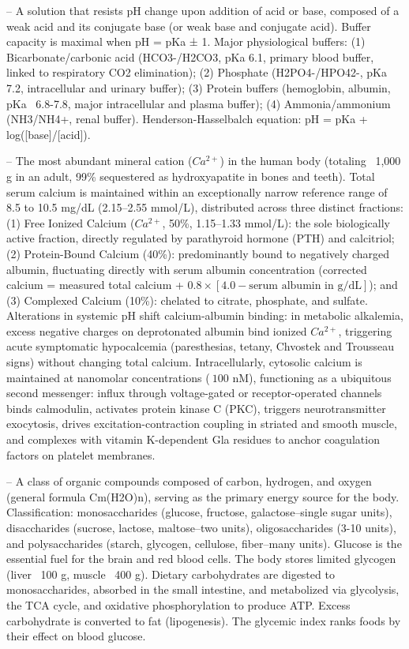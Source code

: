 -- A solution that resists pH change upon addition of acid or base, composed of a weak acid and its conjugate base (or weak base and conjugate acid). Buffer capacity is maximal when pH = pKa ± 1. Major physiological buffers: (1) Bicarbonate/carbonic acid (HCO3-/H2CO3, pKa 6.1, primary blood buffer, linked to respiratory CO2 elimination); (2) Phosphate (H2PO4-/HPO42-, pKa 7.2, intracellular and urinary buffer); (3) Protein buffers (hemoglobin, albumin, pKa ~6.8-7.8, major intracellular and plasma buffer); (4) Ammonia/ammonium (NH3/NH4+, renal buffer). Henderson-Hasselbalch equation: pH = pKa + log([base]/[acid]).

-- The most abundant mineral cation ($Ca^{2+}$) in the human body (totaling ~1,000 g in an adult, 99\% sequestered as hydroxyapatite in bones and teeth). Total serum calcium is maintained within an exceptionally narrow reference range of 8.5 to 10.5 mg/dL (2.15--2.55 mmol/L), distributed across three distinct fractions: (1) Free Ionized Calcium ($Ca^{2+}$, 50\%, 1.15--1.33 mmol/L): the sole biologically active fraction, directly regulated by parathyroid hormone (PTH) and calcitriol; (2) Protein-Bound Calcium (40\%): predominantly bound to negatively charged albumin, fluctuating directly with serum albumin concentration (corrected calcium = measured total calcium + $0.8 \times [4.0 - \text{serum albumin in g/dL}]$); and (3) Complexed Calcium (10\%): chelated to citrate, phosphate, and sulfate. Alterations in systemic pH shift calcium-albumin binding: in metabolic alkalemia, excess negative charges on deprotonated albumin bind ionized $Ca^{2+}$, triggering acute symptomatic hypocalcemia (paresthesias, tetany, Chvostek and Trousseau signs) without changing total calcium. Intracellularly, cytosolic calcium is maintained at nanomolar concentrations ($~100$ nM), functioning as a ubiquitous second messenger: influx through voltage-gated or receptor-operated channels binds calmodulin, activates protein kinase C (PKC), triggers neurotransmitter exocytosis, drives excitation-contraction coupling in striated and smooth muscle, and complexes with vitamin K-dependent Gla residues to anchor coagulation factors on platelet membranes.

-- A class of organic compounds composed of carbon, hydrogen, and oxygen (general formula Cm(H2O)n), serving as the primary energy source for the body. Classification: monosaccharides (glucose, fructose, galactose--single sugar units), disaccharides (sucrose, lactose, maltose--two units), oligosaccharides (3-10 units), and polysaccharides (starch, glycogen, cellulose, fiber--many units). Glucose is the essential fuel for the brain and red blood cells. The body stores limited glycogen (liver ~100 g, muscle ~400 g). Dietary carbohydrates are digested to monosaccharides, absorbed in the small intestine, and metabolized via glycolysis, the TCA cycle, and oxidative phosphorylation to produce ATP. Excess carbohydrate is converted to fat (lipogenesis). The glycemic index ranks foods by their effect on blood glucose.

